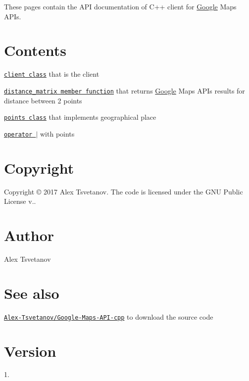 \href{http://nlohmann.github.io/json}{\tt } \href{https://github.com/Alex-Tsvetanov/Google-Maps-API-cpp/blob/master/LICENSE}{\tt } \href{https://github.com/Alex-Tsvetanov/Google-Maps-API-cpp/releases}{\tt } \href{http://github.com/Alex-Tsvetanov/Google-Maps-API-cpp/issues}{\tt } \href{http://isitmaintained.com/project/Alex-Tsvetanov/Google-Maps-API-cpp}{\tt } \href{https://bestpractices.coreinfrastructure.org/projects/980}{\tt }

These pages contain the A\+PI documentation of C++ client for \hyperlink{a00038}{Google} Maps A\+P\+Is.

\section*{Contents}


\begin{DoxyItemize}
\item \href{./a00047.html}{\tt client class} that is the client
\begin{DoxyItemize}
\item \href{./a00047.html#ac6a0c1904a585c4eb930c17e3dcf2ce9}{\tt distance\+\_\+matrix member function} that returns \hyperlink{a00038}{Google} Maps A\+P\+Is results for distance between 2 points
\end{DoxyItemize}
\item \href{./a00063.html}{\tt points class} that implements geographical place
\begin{DoxyItemize}
\item \href{./a00039.html}{\tt operator $\vert$} with points
\end{DoxyItemize}
\end{DoxyItemize}

\section*{Copyright}

Copyright © 2017 Alex Tsvetanov. The code is licensed under the G\+NU Public License v..

\section*{Author}

Alex Tsvetanov

\section*{See also}

\href{https://github.com/Alex-Tsvetanov/Google-Maps-API-cpp}{\tt Alex-\/\+Tsvetanov/\+Google-\/\+Maps-\/\+A\+P\+I-\/cpp} to download the source code

\section*{Version}

1. 